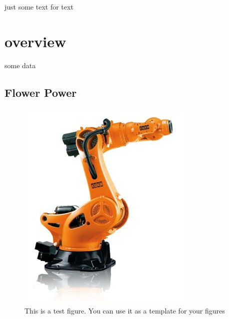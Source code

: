 just some text for text
\section{overview}
some data
\subsection{Flower Power}

\begin{figure}[h]
    \centering
    \includegraphics[width=0.7\linewidth]{figures/kuka}
    \caption[test Fig]{This is a test figure. You can use it as a template for your figures}
    \label{fig:kuka}
\end{figure}
